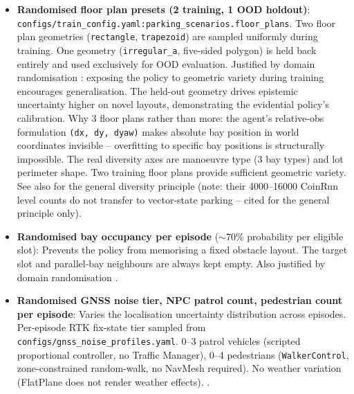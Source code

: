 \documentclass[11pt,a4paper]{article}
\begin{document}
\begin{itemize}[leftmargin=*]
  \item \textbf{Randomised floor plan presets (2 training, 1 OOD holdout)}:
        \texttt{configs/train\_config.yaml:parking\_scenarios.floor\_plans}.
        Two floor plan geometries (\texttt{rectangle}, \texttt{trapezoid}) are
        sampled uniformly during training. One geometry (\texttt{irregular\_a},
        five-sided polygon) is held back entirely and used exclusively for OOD
        evaluation.
        Justified by domain randomisation \cite{tobin2017domain}: exposing the
        policy to geometric variety during training encourages generalisation.
        The held-out geometry drives epistemic uncertainty higher on novel
        layouts, demonstrating the evidential policy's calibration.
        Why 3 floor plans rather than more: the agent's relative-obs formulation
        \texttt{(dx, dy, dyaw)} makes absolute bay position in world coordinates
        invisible -- overfitting to specific bay positions is structurally
        impossible. The real diversity axes are manoeuvre type (3 bay types) and
        lot perimeter shape. Two training floor plans provide sufficient geometric
        variety. See also \cite{cobbe2019quantifying} for the general diversity
        principle (note: their 4000--16000 CoinRun level counts do not transfer
        to vector-state parking -- cited for the general principle only).

  \item \textbf{Randomised bay occupancy per episode} ($\sim$70\% probability
        per eligible slot): Prevents the policy from memorising a fixed obstacle
        layout. The target slot and parallel-bay neighbours are always kept empty.
        Also justified by domain randomisation \cite{tobin2017domain}.

  \item \textbf{Randomised GNSS noise tier, NPC patrol count, pedestrian count per episode}:
        Varies the localisation uncertainty distribution across episodes.
        Per-episode RTK fix-state tier sampled from
        \texttt{configs/gnss\_noise\_profiles.yaml}. 0--3 patrol vehicles
        (scripted proportional controller, no Traffic Manager), 0--4
        pedestrians (\texttt{WalkerControl}, zone-constrained random-walk,
        no NavMesh required). No weather variation (FlatPlane does not
        render weather effects). \cite{tobin2017domain}.


\end{itemize}
\end{document}
